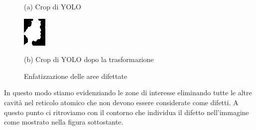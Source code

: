 \documentclass[12pt,a4paper,openright,twoside]{report}
\begin{document}
\begin{figure}[h]
\begin{minipage}[t]{0.49\linewidth}
(a) Crop di YOLO
\end{minipage}%
\hfill\vrule\hfill
\begin{minipage}[t]{0.49\linewidth}
\centering
\includegraphics[width=\linewidth]{graphene_67_bonds_cropped_box_1_thresh_.png}

(b)  Crop di YOLO dopo la trasformazione 
\end{minipage}
\caption{Enfatizzazione delle aree difettate}
\end{figure}

In questo modo stiamo evidenziando le zone di interesse eliminando tutte le altre cavità nel reticolo atomico che non devono essere considerate come difetti.
A questo punto ci ritroviamo con il contorno che individua il difetto nell'immagine come mostrato nella figura sottostante.
\end{document}
